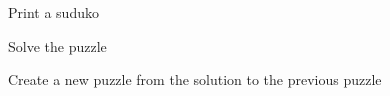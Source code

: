 \documentclass{article}
\begin{document}
Print a suduko
\begin{center}
\end{center}

\newpage
Solve the puzzle
\begin{center}
\end{center}

\newpage
Create a new puzzle from the solution to the previous puzzle
\begin{minipage}[b]{0.4\textwidth}
\begin{center}
\generategrid  %
\end{center}
\end{minipage}
\end{document}
